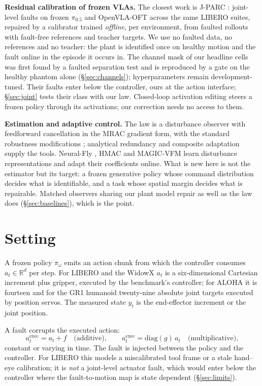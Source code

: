 \documentclass{article}
\begin{document}
\textbf{Residual calibration of frozen VLAs.} The closest work is J-PARC \citep{jparc2026}:
joint-level faults on frozen $\pi_{0.5}$ and OpenVLA-OFT across the same LIBERO suites,
repaired by a calibrator trained \emph{offline}, per environment, from faulted rollouts with
fault-free references and teacher targets. We use no faulted data, no references and no
teacher: the plant is identified once on healthy motion and the fault online in the episode
it occurs in. The channel mask of our headline cells was first found by a faulted separation
test and is reproduced by a gate on the healthy phantom alone (\S\ref{sec:channels});
hyperparameters remain development-tuned. Their faults enter below the controller, ours at
the action interface; \S\ref{sec:joint} tests their class with our law. Closed-loop
activation editing \citep{clae2026} steers a frozen policy through its activations; our
correction needs no access to them.

\textbf{Estimation and adaptive control.} The law is a disturbance observer
\citep{shim2021dob} with feedforward cancellation in the MRAC gradient form, with the
standard robustness modifications \citep{ioannou1996}; analytical redundancy
\citep{isermann2005,chen1999fdi} and composite adaptation \citep{slotine1989composite}
supply the tools. Neural-Fly \citep{neuralfly}, HMAC \citep{hmac2024} and MAGIC-VFM
\citep{magicvfm} learn disturbance representations and adapt their coefficients online. What
is new here is not the estimator but its target: a frozen generative policy whose command
distribution decides what is identifiable, and a task whose spatial margin decides what is
repairable. Matched observers sharing our plant model repair as well as the law does
(\S\ref{sec:baselines}), which is the point.

\section{Setting}
\label{sec:setting}

A frozen policy $\pi_\omega$ emits an action chunk from which the controller consumes
$a_t\in\mathbb{R}^d$ per step. For LIBERO and the WidowX $a_t$ is a six-dimensional
Cartesian increment plus gripper, executed by the benchmark's controller; for ALOHA it is
fourteen and for the GR1 humanoid twenty-nine absolute joint targets executed by position
servos. The measured state $y_t$ is the end-effector increment or the joint position.

A fault corrupts the executed action:
\[
a^{\mathrm{exec}}_t = a_t + f \quad\text{(additive)},\qquad
a^{\mathrm{exec}}_t = \mathrm{diag}(g)\,a_t \quad\text{(multiplicative)},
\]
constant or varying in time. The fault is injected between the policy and the controller.
For LIBERO this models a miscalibrated tool frame or a stale hand--eye calibration; it is
\emph{not} a joint-level actuator fault, which would enter below the controller where the
fault-to-motion map is state dependent (\S\ref{sec:limits}).
\end{document}
